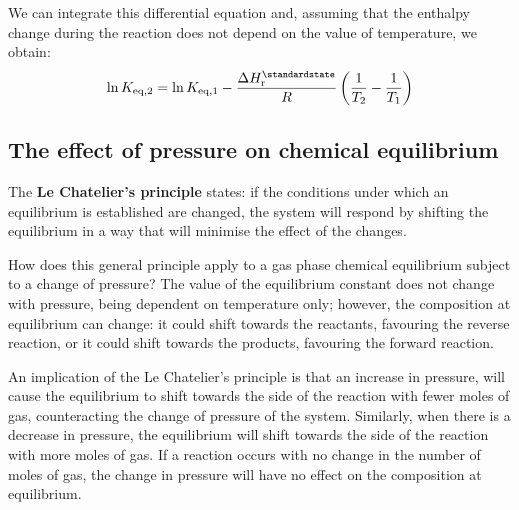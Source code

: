 \documentclass[12pt,a4paper]{report}
\begin{document}
   We can integrate this differential equation and, assuming that the enthalpy change during the reaction does not depend on the value of temperature, we obtain:
    \begin{equation*}
   \ln K_{\mathrm{eq,2}}=\ln K_{\mathrm{eq,1}}-\frac{\Delta H^{\standardstate}_{\mathrm{r}}}{R}\left(\frac{1}{T_{2}}-\frac{1}{T_{1}}\right)
   \end{equation*} 
   \subsection*{The effect of pressure on chemical equilibrium}
   The \textbf{Le Chatelier's principle} states: if the conditions under which an equilibrium is established are changed, the system will respond by shifting the equilibrium in a way that will minimise the effect of the changes. 
   
   How does this general principle apply to a gas phase chemical equilibrium subject to a change of pressure? The value of the equilibrium constant does not change with pressure, being dependent on temperature only; however, the composition at equilibrium can change: it could shift towards the reactants, favouring the reverse reaction, or it could shift towards the products, favouring the forward reaction. 
   
   An implication of the Le Chatelier's principle is that an increase in pressure, will cause the equilibrium to shift towards the side of the reaction with fewer moles of gas, counteracting the change of pressure of the system. Similarly, when there is a decrease in pressure, the equilibrium will shift towards the side of the reaction with more moles of gas. If a reaction occurs with no change in the number of moles of gas, the change in pressure will have no effect on the composition at equilibrium.
\end{document}
